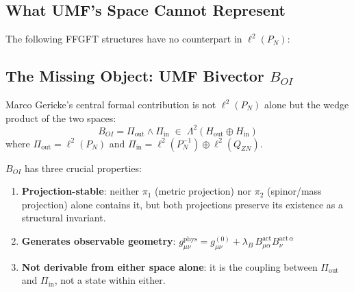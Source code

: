 \subsection{What UMF's Space Cannot Represent}

The following FFGFT structures have no counterpart in $\ell^2(P_N)$:

\begin{center}
\renewcommand{\arraystretch}{1.4}
{\small
{}
}
\end{center}

\subsection{The Missing Object: UMF Bivector \texorpdfstring{$B_{OI}$}{B\_OI}}
\label{sec:bivector}

Marco Gericke's central formal contribution is not $\ell^2(P_N)$ alone but the
wedge product of the two spaces:
\begin{equation}
  B_{OI} = \Pi_\text{out} \wedge \Pi_\text{in}
  \;\in\; \Lambda^2(H_\text{out} \oplus H_\text{in})
  \tag{244.4b}
\end{equation}
where $\Pi_\text{out} = \ell^2(P_N)$ and
$\Pi_\text{in} = \ell^2(P_N^{-1}) \oplus \ell^2(Q_{ZN})$.

$B_{OI}$ has three crucial properties:
\begin{enumerate}
  \item \textbf{Projection-stable}: neither $\pi_1$ (metric projection) nor
    $\pi_2$ (spinor/mass projection) alone contains it, but both projections
    preserve its existence as a structural invariant.
  \item \textbf{Generates observable geometry}:
    $g_{\mu\nu}^\text{phys} = g_{\mu\nu}^{(0)} + \lambda_B\,
    B_{\mu\alpha}^\text{act} B_{\nu}^{\text{act}\,\alpha}$
  \item \textbf{Not derivable from either space alone}: it is the coupling
    between $\Pi_\text{out}$ and $\Pi_\text{in}$, not a state within either.
\end{enumerate}

